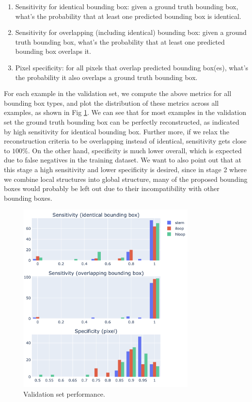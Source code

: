 \documentclass[12pt]{article}
\begin{document}
\begin{enumerate}
    \item Sensitivity for identical bounding box:
    given a ground truth bounding box, what's the probability that at least one predicted bounding box is identical.
    \item Sensitivity for overlapping (including identical) bounding box:
    given a ground truth bounding box, what's the probability that at least one predicted bounding box overlaps it.

    \item Pixel specificity:
    for all pixels that overlap predicted bounding box(es), what's the probability it also overlaps a ground truth bounding box.
\end{enumerate}


For each example in the validation set, we compute the above metrics for all bounding box types,
and plot the distribution of these metrics across all examples, as shown in Fig \ref{fig:performance_metrics}.
We can see that for most examples in the validation set the ground truth bounding box can be perfectly reconstructed,
as indicated by high sensitivity for identical bounding box.
Further more, if we relax the reconstruction criteria to be overlapping instead of identical,
sensitivity gets close to $100\%$.
On the other hand, specificity is much lower overall,
which is expected due to false negatives in the training dataset.
We want to also point out that at this stage a high sensitivity and lower specificity is desired,
since in stage 2 where we combine local structures into global structure, many of the proposed bounding boxes
would probably be left out due to their incompatibility with other bounding boxes.


\begin{figure}[h]
    \centering
    \includegraphics[width=0.8\textwidth]{plot/performance_metrics.png}
    \caption{Validation set performance.}
    \label{fig:performance_metrics}
    \centering
\end{figure}
\end{document}
